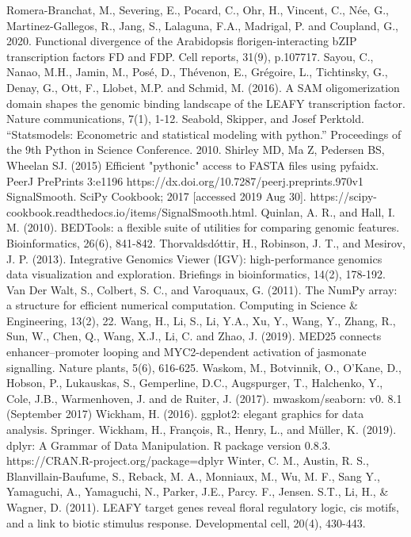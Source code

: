 \documentclass{article}
\begin{document}
\begin{sloppypar}
\begin{thebibliography}{9}
Romera-Branchat, M., Severing, E., Pocard, C., Ohr, H., Vincent, C., Née, G., Martinez-Gallegos, R., Jang, S., Lalaguna, F.A., Madrigal, P. and Coupland, G., 2020. Functional divergence of the Arabidopsis florigen-interacting bZIP transcription factors FD and FDP. Cell reports, 31(9), p.107717.
Sayou, C., Nanao, M.H., Jamin, M., Posé, D., Thévenon, E., Grégoire, L., Tichtinsky, G., Denay, G., Ott, F., Llobet, M.P. and Schmid, M. (2016). A SAM oligomerization domain shapes the genomic binding landscape of the LEAFY transcription factor. Nature communications, 7(1), 1-12.
Seabold, Skipper, and Josef Perktold. “Statsmodels: Econometric and statistical modeling with python.” Proceedings of the 9th Python in Science Conference. 2010.
Shirley MD, Ma Z, Pedersen BS, Wheelan SJ. (2015) Efficient
"pythonic" access to FASTA files using pyfaidx. PeerJ PrePrints 3:e1196
https://dx.doi.org/10.7287/peerj.preprints.970v1
SignalSmooth. SciPy Cookbook; 2017 [accessed 2019 Aug 30].
https://scipy-cookbook.readthedocs.io/items/SignalSmooth.html.
Quinlan, A. R., and Hall, I. M. (2010). BEDTools: a flexible suite of utilities for comparing genomic features. Bioinformatics, 26(6), 841-842.
Thorvaldsdóttir, H., Robinson, J. T., and Mesirov, J. P. (2013). Integrative Genomics Viewer (IGV): high-performance genomics data visualization and exploration. Briefings in bioinformatics, 14(2), 178-192.
Van Der Walt, S., Colbert, S. C., and Varoquaux, G. (2011). The NumPy array: a structure for efficient numerical computation. Computing in Science \& Engineering, 13(2), 22.
Wang, H., Li, S., Li, Y.A., Xu, Y., Wang, Y., Zhang, R., Sun, W., Chen, Q., Wang, X.J., Li, C. and Zhao, J. (2019). MED25 connects enhancer–promoter looping and MYC2-dependent activation of jasmonate signalling. Nature plants, 5(6), 616-625.
Waskom, M., Botvinnik, O., O’Kane, D., Hobson, P., Lukauskas, S., Gemperline, D.C., Augspurger, T., Halchenko, Y., Cole, J.B., Warmenhoven, J. and de Ruiter, J. (2017). mwaskom/seaborn: v0. 8.1 (September 2017)
Wickham, H. (2016). ggplot2: elegant graphics for data analysis. Springer.
Wickham, H., François, R., Henry, L., and Müller, K. (2019). dplyr: A Grammar of Data Manipulation. R package version 0.8.3. https://CRAN.R-project.org/package=dplyr
Winter, C. M., Austin, R. S., Blanvillain-Baufume, S., Reback, M. A., Monniaux, M., Wu, M. F., Sang Y., Yamaguchi, A., Yamaguchi, N., Parker, J.E., Parcy. F., Jensen. S.T., Li, H., \& Wagner, D. (2011). LEAFY target genes reveal floral regulatory logic, cis motifs, and a link to biotic stimulus response. Developmental cell, 20(4), 430-443.

\end{thebibliography}
\end{sloppypar}
\end{document}
